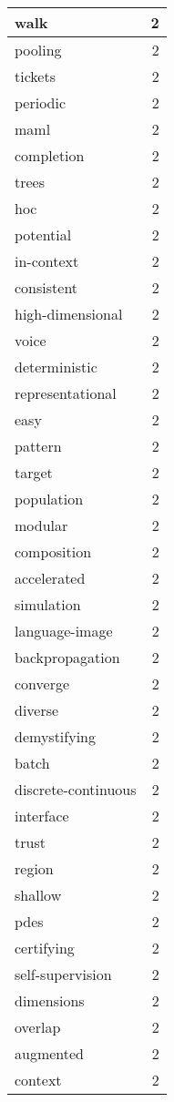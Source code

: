\begin{table}[h]
\begin{tabular}{|l|r|}
\hline
walk & 2 \\
\hline
pooling & 2 \\
\hline
tickets & 2 \\
\hline
periodic & 2 \\
\hline
maml & 2 \\
\hline
completion & 2 \\
\hline
trees & 2 \\
\hline
hoc & 2 \\
\hline
potential & 2 \\
\hline
in-context & 2 \\
\hline
consistent & 2 \\
\hline
high-dimensional & 2 \\
\hline
voice & 2 \\
\hline
deterministic & 2 \\
\hline
representational & 2 \\
\hline
easy & 2 \\
\hline
pattern & 2 \\
\hline
target & 2 \\
\hline
population & 2 \\
\hline
modular & 2 \\
\hline
composition & 2 \\
\hline
accelerated & 2 \\
\hline
simulation & 2 \\
\hline
language-image & 2 \\
\hline
backpropagation & 2 \\
\hline
converge & 2 \\
\hline
diverse & 2 \\
\hline
demystifying & 2 \\
\hline
batch & 2 \\
\hline
discrete-continuous & 2 \\
\hline
interface & 2 \\
\hline
trust & 2 \\
\hline
region & 2 \\
\hline
shallow & 2 \\
\hline
pdes & 2 \\
\hline
certifying & 2 \\
\hline
self-supervision & 2 \\
\hline
dimensions & 2 \\
\hline
overlap & 2 \\
\hline
augmented & 2 \\
\hline
context & 2 \\

\end{tabular}
\end{table}
